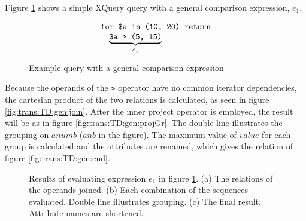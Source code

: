 \begin{myExample}
Figure \ref{fig:trans:TD:genCompQu} shows a simple XQuery query with a general comparison expression, $e_1$.
\begin{figure}[h]
\centering
\begin{equation*}
\begin{array}{l}
\mbox{\texttt{for \$a in (10, 20) return}} \\ \quad
\underbrace{\mbox{\texttt{\$a > (5, 15)}}}_{e_1}
\end{array}
\end{equation*}
\caption{Example query with a general comparison expression \label{fig:trans:TD:genCompQu}}
\end{figure}
 
Because the operands of the \texttt{>} operator have no common iterator dependencies, the cartesian product of the
two relations is calculated, as seen in figure \ref{fig:trans:TD:gen:join}.
After the inner \textsf{project} operator is employed, the result will be as in figure \ref{fig:trans:TD:gen:projGr}. The double line illustrates
the grouping on $anumb$ ($anb$ in the figure). The maximum value of $value$ for each group is calculated and the
attributes are renamed, which gives the relation of figure \ref{fig:trans:TD:gen:end}.

\begin{figure}[h]
\centering
{}
\qquad
{}
\qquad
{}
\caption[Results of evaluating $e_1$ in figure \ref{fig:trans:TD:genCompQu}]{Results of evaluating expression $e_1$
in figure \ref{fig:trans:TD:genCompQu}. (a) The relations of the operands joined. (b) Each combination of the
sequences evaluated. Double line illustrates grouping. (c) The final result. Attribute names are shortened.
\label{fig:trans:TD:genCompRes}}
\end{figure}
 
\end{myExample}
